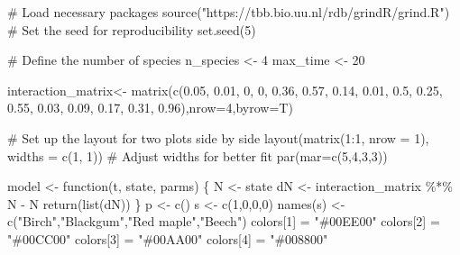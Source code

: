\documentclass[
  a4paper,
]{scrbook}
\newenvironment{Shaded}{\begin{snugshade}}{\end{snugshade}}
\newcommand{\AttributeTok}[1]{\textcolor[rgb]{0.40,0.45,0.13}{#1}}
\newcommand{\CommentTok}[1]{\textcolor[rgb]{0.37,0.37,0.37}{#1}}
\newcommand{\ControlFlowTok}[1]{\textcolor[rgb]{0.00,0.23,0.31}{#1}}
\newcommand{\DecValTok}[1]{\textcolor[rgb]{0.68,0.00,0.00}{#1}}
\newcommand{\FloatTok}[1]{\textcolor[rgb]{0.68,0.00,0.00}{#1}}
\newcommand{\FunctionTok}[1]{\textcolor[rgb]{0.28,0.35,0.67}{#1}}
\newcommand{\NormalTok}[1]{\textcolor[rgb]{0.00,0.23,0.31}{#1}}
\newcommand{\OtherTok}[1]{\textcolor[rgb]{0.00,0.23,0.31}{#1}}
\newcommand{\SpecialCharTok}[1]{\textcolor[rgb]{0.37,0.37,0.37}{#1}}
\newcommand{\StringTok}[1]{\textcolor[rgb]{0.13,0.47,0.30}{#1}}
\theoremstyle{definition}
\theoremstyle{remark}
\begin{document}
\begin{Shaded}
\begin{Highlighting}[]
\CommentTok{\# Load necessary packages}
\FunctionTok{source}\NormalTok{(}\StringTok{"https://tbb.bio.uu.nl/rdb/grindR/grind.R"}\NormalTok{)}
\CommentTok{\# Set the seed for reproducibility}
\FunctionTok{set.seed}\NormalTok{(}\DecValTok{5}\NormalTok{)}

\CommentTok{\# Define the number of species}
\NormalTok{n\_species }\OtherTok{\textless{}{-}} \DecValTok{4}
\NormalTok{max\_time }\OtherTok{\textless{}{-}} \DecValTok{20}

\NormalTok{interaction\_matrix}\OtherTok{\textless{}{-}} \FunctionTok{matrix}\NormalTok{(}\FunctionTok{c}\NormalTok{(}\FloatTok{0.05}\NormalTok{, }\FloatTok{0.01}\NormalTok{, }\DecValTok{0}\NormalTok{, }\DecValTok{0}\NormalTok{,}
         \FloatTok{0.36}\NormalTok{, }\FloatTok{0.57}\NormalTok{, }\FloatTok{0.14}\NormalTok{, }\FloatTok{0.01}\NormalTok{,}
         \FloatTok{0.5}\NormalTok{, }\FloatTok{0.25}\NormalTok{, }\FloatTok{0.55}\NormalTok{, }\FloatTok{0.03}\NormalTok{,}
         \FloatTok{0.09}\NormalTok{, }\FloatTok{0.17}\NormalTok{, }\FloatTok{0.31}\NormalTok{, }\FloatTok{0.96}\NormalTok{),}\AttributeTok{nrow=}\DecValTok{4}\NormalTok{,}\AttributeTok{byrow=}\NormalTok{T)}

\CommentTok{\# Set up the layout for two plots side by side}
\FunctionTok{layout}\NormalTok{(}\FunctionTok{matrix}\NormalTok{(}\DecValTok{1}\SpecialCharTok{:}\DecValTok{1}\NormalTok{, }\AttributeTok{nrow =} \DecValTok{1}\NormalTok{), }\AttributeTok{widths =} \FunctionTok{c}\NormalTok{(}\DecValTok{1}\NormalTok{, }\DecValTok{1}\NormalTok{))  }\CommentTok{\# Adjust widths for better fit}
\FunctionTok{par}\NormalTok{(}\AttributeTok{mar=}\FunctionTok{c}\NormalTok{(}\DecValTok{5}\NormalTok{,}\DecValTok{4}\NormalTok{,}\DecValTok{3}\NormalTok{,}\DecValTok{3}\NormalTok{))}

\NormalTok{model }\OtherTok{\textless{}{-}} \ControlFlowTok{function}\NormalTok{(t, state, parms) \{}
\NormalTok{  N }\OtherTok{\textless{}{-}}\NormalTok{ state}
\NormalTok{  dN }\OtherTok{\textless{}{-}}\NormalTok{ interaction\_matrix }\SpecialCharTok{\%*\%}\NormalTok{ N }\SpecialCharTok{{-}}\NormalTok{ N}
  \FunctionTok{return}\NormalTok{(}\FunctionTok{list}\NormalTok{(dN))  }
\NormalTok{\}}
\NormalTok{p }\OtherTok{\textless{}{-}} \FunctionTok{c}\NormalTok{()}
\NormalTok{s }\OtherTok{\textless{}{-}} \FunctionTok{c}\NormalTok{(}\DecValTok{1}\NormalTok{,}\DecValTok{0}\NormalTok{,}\DecValTok{0}\NormalTok{,}\DecValTok{0}\NormalTok{)}
\FunctionTok{names}\NormalTok{(s) }\OtherTok{\textless{}{-}} \FunctionTok{c}\NormalTok{(}\StringTok{"Birch"}\NormalTok{,}\StringTok{"Blackgum"}\NormalTok{,}\StringTok{"Red maple"}\NormalTok{,}\StringTok{"Beech"}\NormalTok{)}
\NormalTok{colors[}\DecValTok{1}\NormalTok{] }\OtherTok{=} \StringTok{"\#00EE00"}
\NormalTok{colors[}\DecValTok{2}\NormalTok{] }\OtherTok{=} \StringTok{"\#00CC00"}
\NormalTok{colors[}\DecValTok{3}\NormalTok{] }\OtherTok{=} \StringTok{"\#00AA00"}
\NormalTok{colors[}\DecValTok{4}\NormalTok{] }\OtherTok{=} \StringTok{"\#008800"}


\end{Highlighting}
\end{Shaded}
\end{document}

